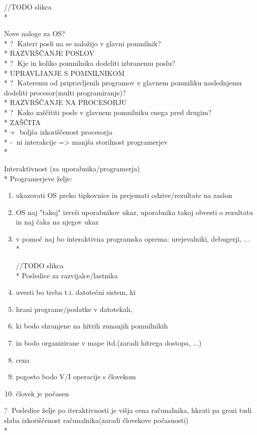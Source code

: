 \documentclass[
  slovene,
  a4paper
]{book}
\begin{document}
//TODO slikca\\*

Nove naloge za OS?\\*
\textcircled{?} Kateri posli na se naložijo v glavni pomnilnik?\\*
RAZVRŠČANJE POSLOV\\*
\textcircled{?} Kje in koliko pomnilnika dodeliti izbranemu poslu?\\*
UPRAVLJANJE S POMNILNIKOM\\*
\textcircled{?} Kateremu od pripravljenih programov v glavnem pomniliku naslednjemu dodeliti procesor(multi programiranje)?\\*
RAZVRŠČANJE NA PROCESORJU\\*
\textcircled{?} Kako zaščititi posle v glavnem pomnilniku enega pred drugim?\\*
ZAŠČITA\\*
\textcircled{+} boljša izkoriščenost procesorja\\*
\textcircled{-} ni interakcije => manjša storilnost programerjev\\*

Interaktivnost (za uporabnika/programerja)\\*
Programerjeve želje:
\begin{enumerate}
  \item ukazovati OS preko tipkovnice in prejemati odzive/rezultate na zaslon
  \item OS naj "takoj" izvrši uporabnikov ukaz, uporabnika takoj obvesti o rezultatu in naj čaka na njegov ukaz
  \item v pomoč naj bo interaktivna programska oprema: urejevalniki, debugerji, ...\\*

//TODO slikca\\*
Posledice za razvijalce/lastnika
  \item uvesti bo treba t.i. datotečni sistem, ki
  	\item hrani programe/podatke v datotekah,
  	\item ki bodo shranjene na hitrih zunanjih pomnilnikih
	\item in bodo organizirane v mape itd.(zaradi hitrega dostopa, ...)
  \item cena
  \item pogosto bodo V/I operacije s človekom
  \item človek je počasen
\end{enumerate}

\textcircled{?} Posledice želje po iteraktivnosti je višja cena računalnika, hkrati pa grozi tudi slaba izkoriščenost računalnika(zaradi človekove počasnosti)\\*
\end{document}
